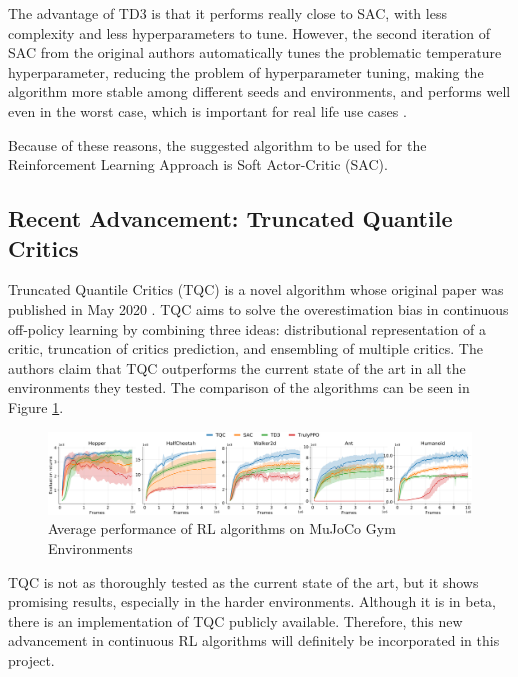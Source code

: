 \documentclass[12pt,twoside]{report}
\begin{document}
The advantage of TD3 is that it performs really close to SAC, with less complexity and less hyperparameters to tune. However, the second iteration of SAC from the original authors automatically tunes the problematic temperature hyperparameter, reducing the problem of hyperparameter tuning, making the algorithm more stable among different seeds and environments, and performs well even in the worst case, which is important for real life use cases \cite{sacOG}. 

Because of these reasons, the suggested algorithm to be used for the Reinforcement Learning Approach is Soft Actor-Critic (SAC).

\subsection{Recent Advancement: Truncated Quantile Critics}

Truncated Quantile Critics (TQC) is a novel algorithm whose original paper was published in May 2020 \cite{tqc-paper}. TQC aims to solve the overestimation bias in continuous off-policy learning by combining three ideas: distributional representation of a critic, truncation of critics prediction, and ensembling of multiple critics. The authors claim that TQC outperforms the current state of the art in all the environments they tested. The comparison of the algorithms can be seen in Figure \ref{fig:tqc-comparison}.

\begin{figure}[h]
\centering
\includegraphics[width = \hsize]{figures/tqc comparison.png}
\caption{Average performance of RL algorithms on MuJoCo Gym Environments \cite{tqc-paper}}
\label{fig:tqc-comparison}
\end{figure}

TQC is not as thoroughly tested as the current state of the art, but it shows promising results, especially in the harder environments. Although it is in beta, there is an implementation of TQC publicly available. Therefore, this new advancement in continuous RL algorithms will definitely be incorporated in this project.
\end{document}
